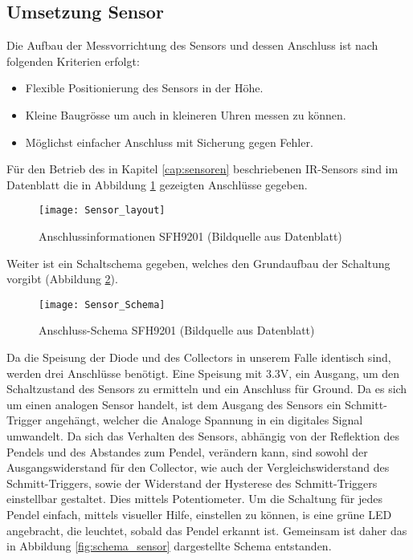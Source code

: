 \subsection{Umsetzung Sensor} %
	Die Aufbau der Messvorrichtung des Sensors und dessen Anschluss ist nach folgenden Kriterien erfolgt:
	\begin{itemize}
		\item Flexible Positionierung des Sensors in der Höhe.
		\item Kleine Baugrösse um auch in kleineren Uhren messen zu können.
		\item Möglichst einfacher Anschluss mit Sicherung gegen Fehler.
	\end{itemize}
	Für den Betrieb des in Kapitel \ref{cap:sensoren} beschriebenen IR-Sensors sind im Datenblatt die in Abbildung \ref{fig:info_SFH9201} gezeigten Anschlüsse gegeben.
	\begin{figure}[H]
		\centering
		\texttt{[image: Sensor\_layout]}
		\caption{Anschlussinformationen SFH9201 (Bildquelle aus Datenblatt)}
		\label{fig:info_SFH9201}
	\end{figure}
	Weiter ist ein Schaltschema gegeben, welches den Grundaufbau der Schaltung vorgibt (Abbildung \ref{fig:schema_SFH9201}).
	\begin{figure}[H]
		\centering
		\texttt{[image: Sensor\_Schema]}
		\caption{Anschluss-Schema SFH9201 (Bildquelle aus Datenblatt)}
		\label{fig:schema_SFH9201}
	\end{figure}
	\noindent Da die Speisung der Diode und des Collectors in unserem Falle identisch sind, werden drei Anschlüsse benötigt. Eine Speisung mit 3.3V, ein Ausgang, um den Schaltzustand des Sensors zu ermitteln und ein Anschluss für Ground. Da es sich um einen analogen Sensor handelt, ist dem Ausgang des Sensors ein Schmitt-Trigger angehängt, welcher die Analoge Spannung in ein digitales Signal umwandelt. Da sich das Verhalten des Sensors, abhängig von der Reflektion des Pendels und des Abstandes zum Pendel, verändern kann, sind sowohl der Ausgangswiderstand für den Collector, wie auch der Vergleichswiderstand des Schmitt-Triggers, sowie der Widerstand der Hysterese des Schmitt-Triggers einstellbar gestaltet. Dies mittels Potentiometer. Um die Schaltung für jedes Pendel einfach, mittels visueller Hilfe, einstellen zu können, is eine grüne LED angebracht, die leuchtet, sobald das Pendel erkannt ist. Gemeinsam ist daher das in Abbildung \ref{fig:schema_sensor} dargestellte Schema entstanden.
